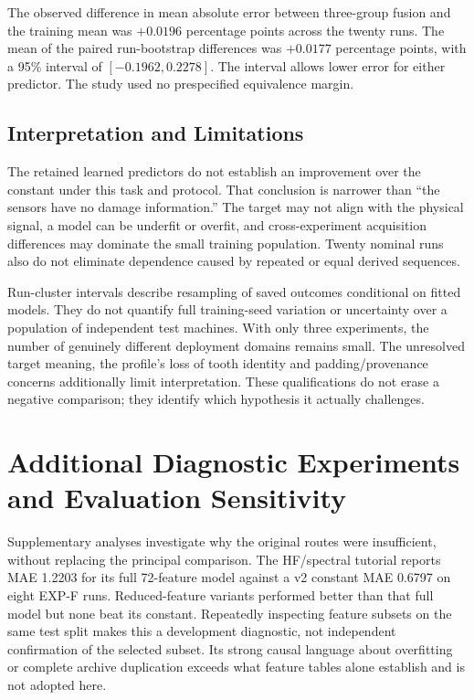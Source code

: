 The observed difference in mean absolute error between three-group fusion and the
training mean was $+0.0196$ percentage points across the twenty runs. The mean of the
paired run-bootstrap differences was $+0.0177$ percentage points, with a 95\% interval
of $[-0.1962,0.2278]$. The interval allows lower error for either predictor. The study
used no prespecified equivalence margin.

\subsection{Interpretation and Limitations}
The retained learned predictors do not establish an improvement over the constant under
this task and protocol. That conclusion is narrower than ``the sensors have no damage
information.'' The target may not align with the physical signal, a model can be
underfit or overfit, and cross-experiment acquisition differences may dominate the small
training population. Twenty nominal runs also do not eliminate dependence caused by
repeated or equal derived sequences.

Run-cluster intervals describe resampling of saved outcomes conditional on fitted
models. They do not quantify full training-seed variation or uncertainty over a
population of independent test machines. With only three experiments, the number of
genuinely different deployment domains remains small. The unresolved target meaning, the
profile's loss of tooth identity and padding/provenance concerns additionally limit
interpretation. These qualifications do not erase a negative comparison; they identify
which hypothesis it actually challenges.

\section{Additional Diagnostic Experiments and Evaluation Sensitivity}
Supplementary analyses investigate why the original routes were insufficient, without
replacing the principal comparison. The HF/spectral tutorial reports MAE 1.2203 for its
full 72-feature model against a v2 constant MAE 0.6797 on eight EXP-F runs.
Reduced-feature variants performed better than that full model but none beat its
constant. Repeatedly inspecting feature subsets on the same test split makes this a
development diagnostic, not independent confirmation of the selected subset. Its strong
causal language about overfitting or complete archive duplication exceeds what feature
tables alone establish and is not adopted here.

